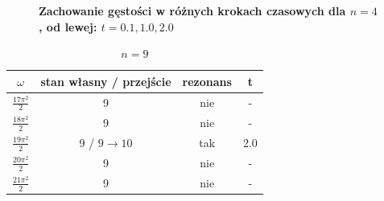 \documentclass[11pt,a4paper]{article}
\begin{document}
\begin{figure}[ht!]
\begin{multicols}{3}
    \end{multicols}
    \caption{\textbf{Zachowanie gęstości w różnych krokach czasowych dla $n=4$, od lewej: $t=0.1,1.0,2.0$}}
\end{figure}


\begin{table}[h!]
\vspace{1.5cm}
\begin{center}
\begin{tabular}{|| c | c | c | c ||}
    \hline
    $\omega$ & stan własny / przejście & rezonans & t\\
    \hline
    $\frac{17\pi^2}{2}$ & 9 & nie & -\\
    \hline
    $\frac{18\pi^2}{2}$ & 9 & nie & -\\
    \hline
    $\frac{19\pi^2}{2}$ & 9 / $9\rightarrow10$ & tak & 2.0\\
    \hline
    $\frac{20\pi^2}{2}$ & 9 & nie & -\\
    \hline
    $\frac{21\pi^2}{2}$ & 9 & nie & -\\
    \hline
\end{tabular}
\caption{$n=9$}
\end{center}
\end{table}
\end{document}
